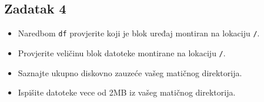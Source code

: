 \documentclass[12pt,a4paper]{article}
\newcommand{\shell}[1]{\texttt{#1}}
\begin{document}
	\subsection*{Zadatak 4}
	\begin{itemize}
		\item Naredbom \shell{df} provjerite koji je blok uređaj montiran na lokaciju \shell{/}.
		\item Provjerite veličinu blok datoteke montirane na lokaciju \shell{/}.
		\item Saznajte ukupno diskovno zauzeće vašeg matičnog direktorija.
		\item Ispišite datoteke vece od 2MB iz vašeg matičnog direktorija. 
	\end{itemize}
\end{document}
